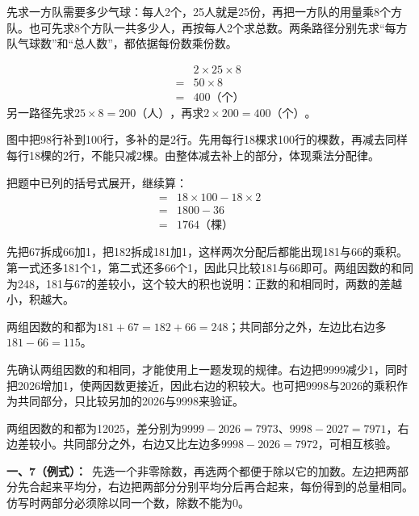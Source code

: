 \documentclass[multi=snippet,border=0pt]{standalone}
\newenvironment{snippet}[3]{\begin{minipage}{#1bp}\color{answerred}\fontsize{#2}{#3}\selectfont\raggedright}{\end{minipage}}
\begin{document}
\begin{snippet}{505}{11.5}{14}先求一方队需要多少气球：每人2个，25人就是25份，再把一方队的用量乘8个方队。也可先求8个方队一共多少人，再按每人2个求总数。两条路径分别先求“每方队气球数”和“总人数”，都依据每份数乘份数。\par \[\begin{aligned}&2\times25\times8\\={}&50\times8\\={}&400\text{（个）}\end{aligned}\]另一路径先求\(25\times8=200\text{（人）}\)，再求\(2\times200=400\text{（个）}\)。\end{snippet}
\begin{snippet}{505}{11.5}{14}图中把98行补到100行，多补的是2行。先用每行18棵求100行的棵数，再减去同样每行18棵的2行，不能只减2棵。由整体减去补上的部分，体现乘法分配律。\par 把题中已列的括号式展开，继续算：\[\begin{aligned}={}&18\times100-18\times2\\={}&1800-36\\={}&1764\text{（棵）}\end{aligned}\]\end{snippet}
\begin{snippet}{505}{11.5}{14}先把67拆成66加1，把182拆成181加1，这样两次分配后都能出现181与66的乘积。第一式还多181个1，第二式还多66个1，因此只比较181与66即可。两组因数的和同为248，181与67的差较小，这个较大的积也说明：正数的和相同时，两数的差越小，积越大。\par 两组因数的和都为\(181+67=182+66=248\)；共同部分之外，左边比右边多\(181-66=115\)。\end{snippet}
\begin{snippet}{505}{11.5}{14}先确认两组因数的和相同，才能使用上一题发现的规律。右边把9999减少1，同时把2026增加1，使两因数更接近，因此右边的积较大。也可把9998与2026的乘积作为共同部分，只比较另加的2026与9998来验证。\par 两组因数的和都为12025，差分别为\(9999-2026=7973\)、\(9998-2027=7971\)，右边差较小。共同部分之外，右边又比左边多\(9998-2026=7972\)，可相互核验。\end{snippet}
\begin{snippet}{505}{11.5}{14}\textbf{一、7（例式）：}\ 先选一个非零除数，再选两个都便于除以它的加数。左边把两部分先合起来平均分，右边把两部分分别平均分后再合起来，每份得到的总量相同。仿写时两部分必须除以同一个数，除数不能为0。\end{snippet}
\end{document}
